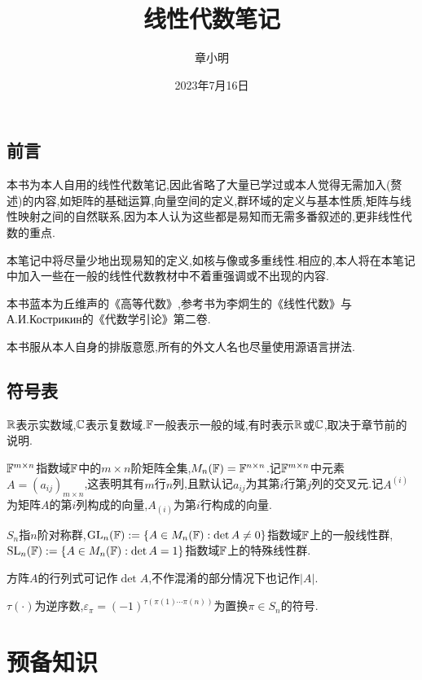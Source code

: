 \documentclass[openany]{book}
\title{线性代数笔记}
\author{章小明}
\date{2023年7月16日}
\begin{document}
\maketitle
\tableofcontents{}

\newpage
\section*{前言}
本书为本人自用的线性代数笔记,因此省略了大量已学过或本人觉得无需加入(赘述)的内容,如矩阵的基础运算,向量空间的定义,群环域的定义与基本性质,矩阵与线性映射之间的自然联系,因为本人认为这些都是易知而无需多番叙述的,更非线性代数的重点.

本笔记中将尽量少地出现易知的定义,如核与像或多重线性.相应的,本人将在本笔记中加入一些在一般的线性代数教材中不着重强调或不出现的内容.

本书蓝本为丘维声的《高等代数》,参考书为李炯生的《线性代数》与А.И.Кострикин的《代数学引论》第二卷.

本书服从本人自身的排版意愿,所有的外文人名也尽量使用源语言拼法.

\section*{符号表}
$\mathbb{R}$表示实数域,$\mathbb{C}$表示复数域.$\mathbb{F}$一般表示一般的域,有时表示$\mathbb{R}$或$\mathbb{C}$,取决于章节前的说明.

$\mathbb{F}^{m\times n}$指数域$\mathbb{F}$中的$m\times n$阶矩阵全集,$M_n(\mathbb{F})=\mathbb{F}^{n\times n}$.记$\mathbb{F}^{m\times n}$中元素$A=(a_{ij})_{m\times n}$,这表明其有$m$行$n$列,且默认记$a_{ij}$为其第$i$行第$j$列的交叉元.记$A^{(i)}$为矩阵$A$的第$i$列构成的向量,$A_{(i)}$为第$i$行构成的向量.

$S_n$指$n$阶对称群,$\operatorname{GL}_n(\mathbb{F}):=\left\{A\in M_n(\mathbb{F}):\det A\neq 0\right\}$指数域$\mathbb{F}$上的一般线性群,$\operatorname{SL}_n(\mathbb{F}):=\left\{A\in M_n(\mathbb{F}):\det A=1\right\}$指数域$\mathbb{F}$上的特殊线性群.

方阵$A$的行列式可记作$\det A$,不作混淆的部分情况下也记作$|A|$.

$\tau(\cdot)$为逆序数,$\varepsilon_\pi=(-1)^{\tau(\pi(1)\cdots\pi(n))}$为置换$\pi\in S_n$的符号.

\chapter{预备知识}
\end{document}
